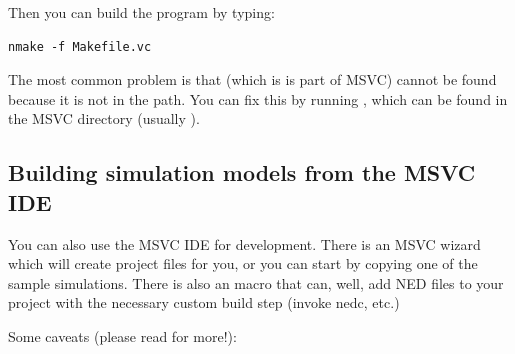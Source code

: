 Then you can build the program by typing:

\begin{verbatim}
nmake -f Makefile.vc
\end{verbatim}

The most common problem is that  (which is is part of MSVC)
cannot be found because it is not in the path. You can fix
this by running , which can be found in the
MSVC  directory (usually
).


\subsection{Building simulation models from the MSVC IDE}

You can also use the MSVC IDE for development.
There is an MSVC wizard which will create project files for you,
or you can start by copying one of the sample simulations.
There is also an  macro that can, well, add
NED files to your project with the necessary custom build step
(invoke nedc, etc.)

Some caveats (please read  for more!):


